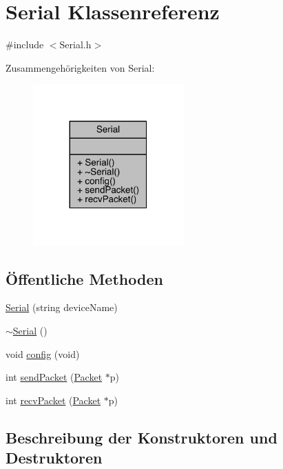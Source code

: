 \hypertarget{class_serial}{}\section{Serial Klassenreferenz}
\label{class_serial}


{\ttfamily \#include $<$Serial.\+h$>$}



Zusammengehörigkeiten von Serial\+:\nopagebreak
\begin{figure}[H]
\begin{center}
\leavevmode
\includegraphics[width=164pt]{class_serial__coll__graph}
\end{center}
\end{figure}
\subsection*{Öffentliche Methoden}
\begin{DoxyCompactItemize}
\item 
\hyperlink{class_serial_aea3e406c2ef3b723c402068269634821}{Serial} (string device\+Name)
\item 
\hyperlink{class_serial_a5b32c394c0ff923a4ef1c13cfb20a6ba}{$\sim$\+Serial} ()
\item 
void \hyperlink{class_serial_a50aa90466c7c87af0178cfd496da36be}{config} (void)
\item 
int \hyperlink{class_serial_a18fe9cf8fc366e6691b6ddf5e9b473a1}{send\+Packet} (\hyperlink{struct_packet}{Packet} $\ast$p)
\item 
int \hyperlink{class_serial_a357fce40e93f5a3700bfec09defd0bf9}{recv\+Packet} (\hyperlink{struct_packet}{Packet} $\ast$p)
\end{DoxyCompactItemize}


\subsection{Beschreibung der Konstruktoren und Destruktoren}
\hypertarget{class_serial_aea3e406c2ef3b723c402068269634821}{}\label{class_serial_aea3e406c2ef3b723c402068269634821} 

